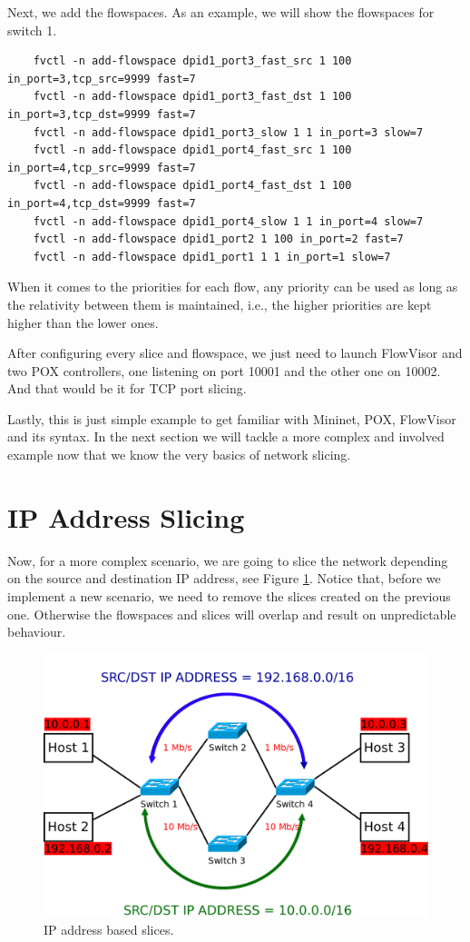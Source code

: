 Next, we add the flowspaces. As an example, we will show the flowspaces for switch 1.
\begin{lstlisting}
    fvctl -n add-flowspace dpid1_port3_fast_src 1 100 in_port=3,tcp_src=9999 fast=7
    fvctl -n add-flowspace dpid1_port3_fast_dst 1 100 in_port=3,tcp_dst=9999 fast=7
    fvctl -n add-flowspace dpid1_port3_slow 1 1 in_port=3 slow=7
    fvctl -n add-flowspace dpid1_port4_fast_src 1 100 in_port=4,tcp_src=9999 fast=7
    fvctl -n add-flowspace dpid1_port4_fast_dst 1 100 in_port=4,tcp_dst=9999 fast=7
    fvctl -n add-flowspace dpid1_port4_slow 1 1 in_port=4 slow=7
    fvctl -n add-flowspace dpid1_port2 1 100 in_port=2 fast=7
    fvctl -n add-flowspace dpid1_port1 1 1 in_port=1 slow=7
\end{lstlisting}

When it comes to the priorities for each flow, any priority can be used as long as the relativity between them is maintained, i.e., the higher priorities are kept higher than the lower ones.

After configuring every slice and flowspace, we just need to launch FlowVisor and two POX controllers, one listening on port 10001 and the other one on 10002. And that would be it for TCP port slicing. 

Lastly, this is just simple example to get familiar with Mininet, POX, FlowVisor and its syntax. In the next section we will tackle a more complex and involved example now that we know the very basics of network slicing.

\section{IP Address Slicing}
Now, for a more complex scenario, we are going to slice the network depending on the source and destination IP address, see Figure \ref{fig:IP_slicing}. Notice that, before we implement a new scenario, we need to remove the slices created on the previous one. Otherwise the flowspaces and slices will overlap and result on unpredictable behaviour.
\begin{figure}
  \centering
  \includegraphics[width=\linewidth]{imagenes/Implementation/mininet_topology_IP_slicing.png}
  \caption{IP address based slices.}
  \label{fig:IP_slicing}
\end{figure}

